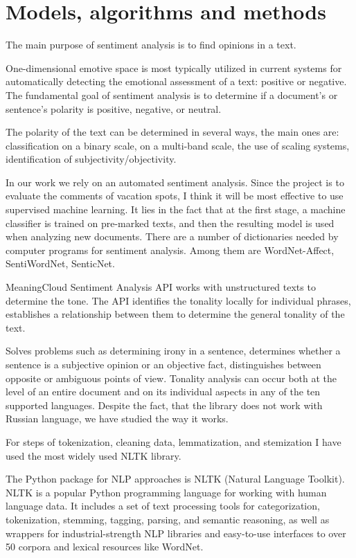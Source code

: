 \documentclass{article}
\begin{document}
\newpage
\section{Models, algorithms and methods}
The main purpose of sentiment analysis is to find opinions in a text.\cite{tran2019measuring}

One-dimensional emotive space is most typically utilized in current systems for automatically detecting the emotional assessment of a text: positive or negative. The fundamental goal of sentiment analysis is to determine if a document's or sentence's polarity is positive, negative, or neutral.

The polarity of the text can be determined in several ways, the main ones are: classification on a binary scale, on a multi-band scale, the use of scaling systems, identification of subjectivity/objectivity. 

In our work we rely on an automated sentiment analysis. Since the project is to evaluate the comments of vacation spots, I think it will be most effective to use supervised machine learning. It lies in the fact that at the first stage, a machine classifier is trained on pre-marked texts, and then the resulting model is used when analyzing new documents. There are a number of dictionaries needed by computer programs for sentiment analysis. Among them are WordNet-Affect, SentiWordNet, SenticNet.

MeaningCloud Sentiment Analysis API  works with unstructured texts to determine the tone. The API identifies the tonality locally for individual phrases, establishes a relationship between them to determine the general tonality of the text.

Solves problems such as determining irony in a sentence, determines whether a sentence is a subjective opinion or an objective fact, distinguishes between opposite\cite{duchin2009markowitz} or ambiguous points of view. Tonality analysis can occur both at the level of an entire document and on its individual aspects in any of the ten supported languages. Despite the fact, that the library does not work with Russian language, we have studied the way it works. 

For steps of tokenization, cleaning data, lemmatization, and stemization I have used the most widely used NLTK library.

The Python package for NLP approaches is NLTK (Natural Language Toolkit). NLTK is a popular Python programming language for working with human language data. It includes a set of text processing tools for categorization, tokenization, stemming, tagging, parsing, and semantic reasoning, as well as wrappers for industrial-strength NLP libraries and easy-to-use interfaces to over 50 corpora and lexical resources like WordNet.
\end{document}
